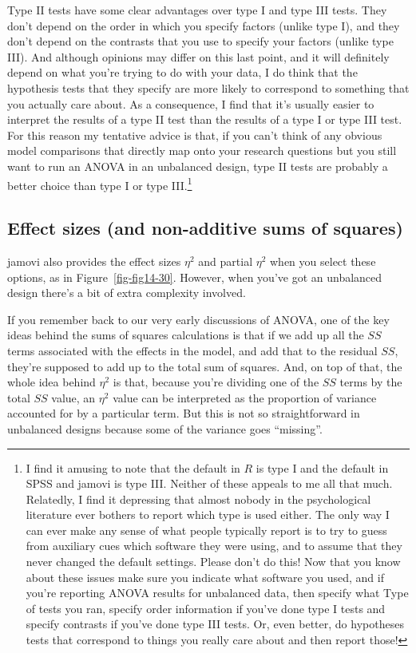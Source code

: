 \documentclass[
  a4paper,
]{book}
\begin{document}
Type II tests have some clear advantages over type I and type III tests.
They don't depend on the order in which you specify factors (unlike type
I), and they don't depend on the contrasts that you use to specify your
factors (unlike type III). And although opinions may differ on this last
point, and it will definitely depend on what you're trying to do with
your data, I do think that the hypothesis tests that they specify are
more likely to correspond to something that you actually care about. As
a consequence, I find that it's usually easier to interpret the results
of a type II test than the results of a type I or type III test. For
this reason my tentative advice is that, if you can't think of any
obvious model comparisons that directly map onto your research questions
but you still want to run an ANOVA in an unbalanced design, type II
tests are probably a better choice than type I or type III.\footnote{I
  find it amusing to note that the default in \(R\) is type I and the
  default in SPSS and jamovi is type III. Neither of these appeals to me
  all that much. Relatedly, I find it depressing that almost nobody in
  the psychological literature ever bothers to report which type is used
  either. The only way I can ever make any sense of what people
  typically report is to try to guess from auxiliary cues which software
  they were using, and to assume that they never changed the default
  settings. Please don't do this! Now that you know about these issues
  make sure you indicate what software you used, and if you're reporting
  ANOVA results for unbalanced data, then specify what Type of tests you
  ran, specify order information if you've done type I tests and specify
  contrasts if you've done type III tests. Or, even better, do
  hypotheses tests that correspond to things you really care about and
  then report those!}

\hypertarget{effect-sizes-and-non-additive-sums-of-squares}{%
\subsection{Effect sizes (and non-additive sums of
squares)}\label{effect-sizes-and-non-additive-sums-of-squares}}

jamovi also provides the effect sizes \(\eta^2\) and partial \(\eta^2\)
when you select these options, as in Figure~\ref{fig-fig14-30}. However,
when you've got an unbalanced design there's a bit of extra complexity
involved.

If you remember back to our very early discussions of ANOVA, one of the
key ideas behind the sums of squares calculations is that if we add up
all the \(SS\) terms associated with the effects in the model, and add
that to the residual \(SS\), they're supposed to add up to the total sum
of squares. And, on top of that, the whole idea behind \(\eta^2\) is
that, because you're dividing one of the \(SS\) terms by the total
\(SS\) value, an \(\eta^2\) value can be interpreted as the proportion
of variance accounted for by a particular term. But this is not so
straightforward in unbalanced designs because some of the variance goes
``missing''.
\end{document}
